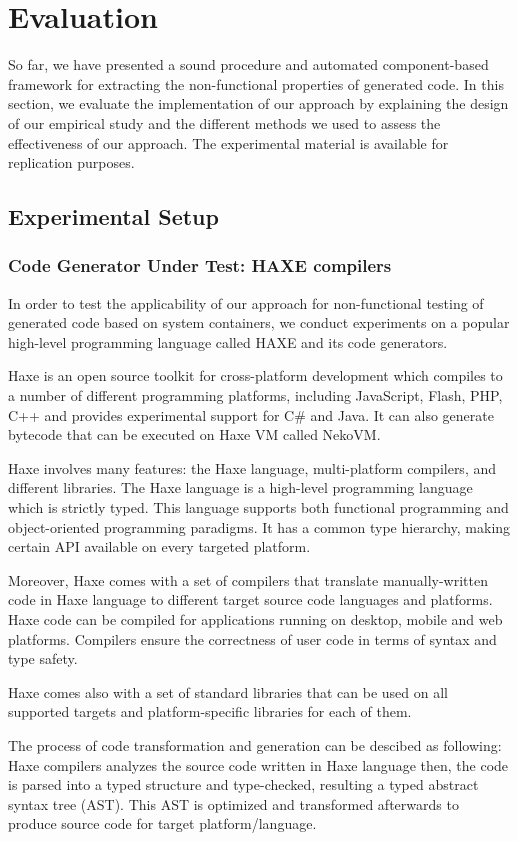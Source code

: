 \section{Evaluation}
So far, we have presented a sound procedure and automated component-based framework for extracting the non-functional properties of generated code. In this section, we evaluate the implementation of our approach by explaining the design of our empirical study and the different methods we used to assess the effectiveness of our approach. 
The experimental material is available for replication purposes.
\subsection{Experimental Setup}
\subsubsection{Code Generator Under Test: HAXE compilers}
In order to test the applicability of our approach for non-functional testing of generated code based on system containers, we conduct experiments on a popular high-level programming language called HAXE and its code generators.

Haxe is an open source toolkit for cross-platform development which compiles to a number of different programming platforms, including JavaScript, Flash, PHP, C++ and provides experimental support for C\# and Java. It can also generate bytecode that can be executed on Haxe VM called NekoVM.

Haxe involves many features: the Haxe language, multi-platform compilers, and different libraries. The Haxe language is a high-level programming language which is strictly typed. This language supports both functional programming and object-oriented programming paradigms. It has a common type hierarchy, making certain API available on every targeted platform.

Moreover, Haxe comes with a set of compilers that translate manually-written code in Haxe language to different target source code languages and platforms. 
Haxe code can be compiled for applications running on desktop, mobile and web platforms. Compilers ensure the correctness of user code in terms of syntax and type safety.

Haxe comes also with a set of standard libraries that can be used on all supported targets and platform-specific libraries for each of them.

The process of code transformation and generation can be descibed as following: Haxe compilers analyzes the source code written in Haxe language then, the code is parsed into a typed structure and type-checked, resulting a typed abstract syntax tree (AST). This AST is optimized and transformed afterwards to produce source code for target platform/language.

